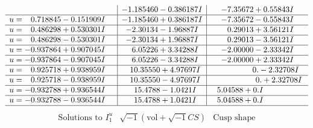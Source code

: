 \documentclass[1p]{elsarticle_modified}
\theoremstyle{definition}
\newcommand{\I}{\sqrt{-1}}
\begin{document}
$$\begin{array}{c|c|c}
 & -1.185460 - 0.386187 I & -7.35672 + 0.55843 I \\ \hline\begin{aligned}
u &= \phantom{-}0.718845 - 0.151909 I\end{aligned}
 & -1.185460 + 0.386187 I & -7.35672 - 0.55843 I \\ \hline\begin{aligned}
u &= \phantom{-}0.486298 + 0.530301 I\end{aligned}
 & -2.30134 - 1.96887 I & \phantom{-}0.29013 + 3.56121 I \\ \hline\begin{aligned}
u &= \phantom{-}0.486298 - 0.530301 I\end{aligned}
 & -2.30134 + 1.96887 I & \phantom{-}0.29013 - 3.56121 I \\ \hline\begin{aligned}
u &= -0.937864 + 0.907045 I\end{aligned}
 & \phantom{-}6.05226 + 3.34288 I & -2.00000 - 2.33342 I \\ \hline\begin{aligned}
u &= -0.937864 - 0.907045 I\end{aligned}
 & \phantom{-}6.05226 - 3.34288 I & -2.00000 + 2.33342 I \\ \hline\begin{aligned}
u &= \phantom{-}0.925718 + 0.938959 I\end{aligned}
 & \phantom{-}10.35550 + 4.97697 I & \phantom{-0.000000 } 0. - 2.32708 I \\ \hline\begin{aligned}
u &= \phantom{-}0.925718 - 0.938959 I\end{aligned}
 & \phantom{-}10.35550 - 4.97697 I & \phantom{-0.000000 -}0. + 2.32708 I \\ \hline\begin{aligned}
u &= -0.932788 + 0.936544 I\end{aligned}
 & \phantom{-}15.4788 - 1.0421 I & \phantom{-}5.04588 + 0. I\phantom{ +0.000000I} \\ \hline\begin{aligned}
u &= -0.932788 - 0.936544 I\end{aligned}
 & \phantom{-}15.4788 + 1.0421 I & \phantom{-}5.04588 + 0. I\phantom{ +0.000000I}\\
 \hline 
 \end{array}$$\newpage$$\begin{array}{c|c|c}  
\text{Solutions to }I^u_{1}& \I (\text{vol} + \sqrt{-1}CS) & \text{Cusp shape}\\

\end{array}$$
\end{document}
